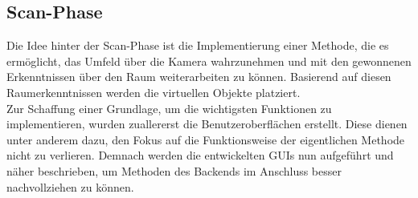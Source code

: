 \subsection{Scan-Phase} %
\label{chap:scan_implementation}
Die Idee hinter der Scan-Phase ist die Implementierung einer Methode, die es ermöglicht, das Umfeld über die Kamera wahrzunehmen und mit den gewonnenen 
Erkenntnissen über den Raum weiterarbeiten zu können. Basierend auf diesen Raumerkenntnissen werden die virtuellen Objekte platziert. 
\\ 
Zur Schaffung einer Grundlage, um die wichtigsten Funktionen zu implementieren, wurden zuallererst die Benutzeroberflächen erstellt. Diese dienen 
unter anderem dazu, den Fokus auf die Funktionsweise der eigentlichen Methode nicht zu verlieren. Demnach werden die entwickelten \acs{GUI}s nun aufgeführt 
und näher beschrieben, um Methoden des Backends im Anschluss besser nachvollziehen zu können.
